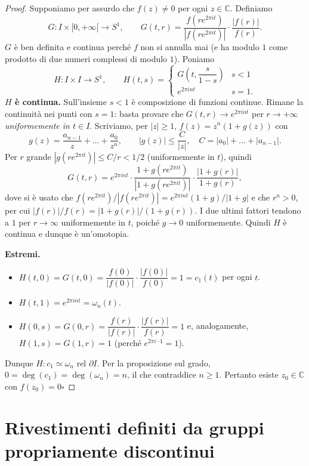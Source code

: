 \begin{proof}
Supponiamo per assurdo che $f(z) \neq 0$ per ogni $z \in \mathbb{C}$. Definiamo
\[
G: I \times [0, +\infty[ \longrightarrow S^1, \qquad G(t,r) = \frac{f(r e^{2\pi i t})}{|f(r e^{2\pi i t})|} \cdot \frac{|f(r)|}{f(r)} .
\]
$G$ \`e ben definita e continua perch\'e $f$ non si annulla mai (e ha modulo $1$ come prodotto di due numeri complessi di modulo $1$). Poniamo
\[
H: I \times I \to S^1, \qquad H(t,s) = \begin{cases} G\!\left(t, \dfrac{s}{1-s}\right) & s < 1 \\[2mm] e^{2\pi i n t} & s = 1. \end{cases}
\]
\textbf{$H$ \`e continua.} Sull'insieme $s<1$ \`e composizione di funzioni continue. Rimane la continuit\`a nei punti con $s = 1$: basta provare che $G(t,r) \to e^{2\pi i n t}$ per $r \to +\infty$ \emph{uniformemente in $t \in I$}. Scriviamo, per $|z| \geqslant 1$, $f(z) = z^n (1 + g(z))$ con
\[
g(z) = \frac{a_{n-1}}{z} + \dots + \frac{a_0}{z^n}, \qquad |g(z)| \leqslant \frac{C}{|z|}, \quad C = |a_0| + \dots + |a_{n-1}|.
\]
Per $r$ grande $|g(re^{2\pi i t})| \leqslant C/r < 1/2$ (uniformemente in $t$), quindi
\[
G(t,r) = e^{2\pi i n t} \cdot \frac{1 + g(re^{2\pi i t})}{|1 + g(re^{2\pi i t})|} \cdot \frac{|1 + g(r)|}{1 + g(r)} ,
\]
dove si \`e usato che $f(re^{2\pi i t})/|f(re^{2\pi i t})| = e^{2\pi i n t}(1+g)/|1+g|$ e che $r^n>0$, per cui $|f(r)|/f(r) = |1+g(r)|/(1+g(r))$. I due ultimi fattori tendono a $1$ per $r \to \infty$ uniformemente in $t$, poich\'e $g \to 0$ uniformemente. Quindi $H$ \`e continua e dunque \`e un'omotopia.

\textbf{Estremi.}
\begin{itemize}
    \item $H(t,0) = G(t,0) = \dfrac{f(0)}{|f(0)|} \cdot \dfrac{|f(0)|}{f(0)} = 1 = c_1(t)$ per ogni $t$.
    \item $H(t,1) = e^{2\pi i n t} = \omega_n(t)$.
    \item $H(0,s) = G(0,r) = \dfrac{f(r)}{|f(r)|} \cdot \dfrac{|f(r)|}{f(r)} = 1$ e, analogamente, $H(1,s) = G(1,r) = 1$ (perch\'e $e^{2\pi i \cdot 1} = 1$).
\end{itemize}
Dunque $H: c_1 \simeq \omega_n$ rel $\partial I$. Per la proposizione sul grado, $0 = \deg(c_1) = \deg(\omega_n) = n$, il che contraddice $n \geqslant 1$. Pertanto esiste $z_0 \in \mathbb{C}$ con $f(z_0) = 0$\hfill$\square$
\end{proof}


\section{Rivestimenti definiti da gruppi propriamente discontinui}


